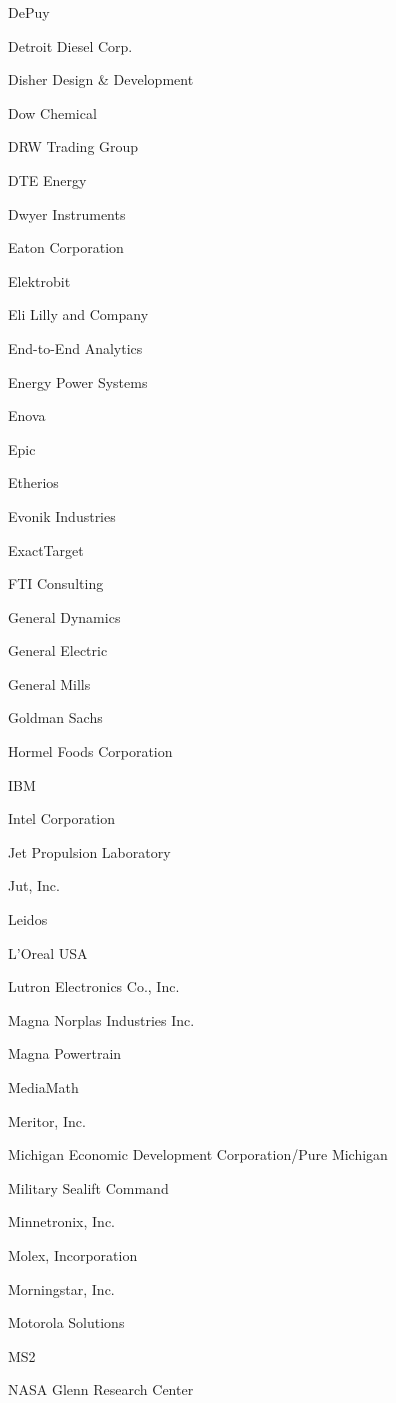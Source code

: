 \documentclass[twoside]{article}
\begin{document}
\begin{center}
\begin{multicols}{5}
\begin{FlushLeft}
\begin{compactitem}
\item DePuy
\item Detroit Diesel Corp.
\item Disher Design \& Development
\item Dow Chemical
\item DRW Trading Group
\item DTE Energy
\item Dwyer Instruments
\item Eaton Corporation
\item Elektrobit
\item Eli Lilly and Company
\item End-to-End Analytics
\item Energy Power Systems
\item Enova
\item Epic
\item Etherios
\item Evonik Industries
\item ExactTarget
\item FTI Consulting
\item General Dynamics
\item General Electric
\item General Mills
\item Goldman Sachs
\item Hormel Foods Corporation
\item IBM
\item Intel Corporation
\item Jet Propulsion Laboratory
\item Jut, Inc.
\item Leidos
\item L'Oreal USA
\item Lutron Electronics Co., Inc.
\item Magna Norplas Industries Inc.
\item Magna Powertrain
\item MediaMath
\item Meritor, Inc.
\item Michigan Economic Development Corporation/Pure Michigan
\item Military Sealift Command
\item Minnetronix, Inc.
\item Molex, Incorporation
\item Morningstar, Inc.
\item Motorola Solutions
\item MS2
\item NASA Glenn Research Center

\end{compactitem}
\end{FlushLeft}
\end{multicols}
\end{center}
\end{document}
